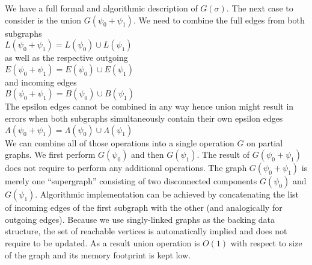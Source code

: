 We have a full formal and algorithmic description of $G(\sigma)$. The next case to consider is the union $G(\psi_0 + \psi_1)$. We need to
combine the full edges from both subgraphs \\
$L(\psi_0 + \psi_1) = L(\psi_0)\cup L(\psi_1) $ \\
as well as the respective outgoing \\
$E(\psi_0 + \psi_1) = E(\psi_0)\cup E(\psi_1) $ \\
and incoming edges \\
$B(\psi_0 + \psi_1) = B(\psi_0)\cup B(\psi_1) $ \\
The epsilon edges cannot be combined in any way hence union might result in errors when both subgraphs simultaneously contain their own epsilon edges \\
$\Lambda(\psi_0+\psi_1) = \Lambda(\psi_0) \cup \Lambda(\psi_1)$ \\
We can combine all of those operations into a single operation $G$ on partial graphs. We first perform $G(\psi_0)$ and then $G(\psi_1)$. The result of $G(\psi_0 + \psi_1)$ does not require to perform any additional operations. The graph $G(\psi_0 + \psi_1)$ is merely one ``supergraph'' consisting of two disconnected components $G(\psi_0)$ and $G(\psi_1)$. Algorithmic implementation can be achieved by concatenating the list of incoming edges of the first subgraph with the other (and analogically for outgoing edges). Because we use singly-linked graphs as the backing data structure, the set of reachable vertices is automatically implied and does not require to be updated.
As a result union operation is $O(1)$ with respect to size of the graph and its memory footprint is kept low. 


